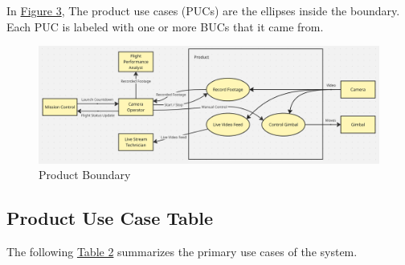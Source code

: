 \documentclass[12pt]{article}
\begin{document}
In \hyperref[img:product-boundary]{Figure 3}, The product use cases (PUCs) are
the ellipses inside the boundary. Each PUC is labeled with one or more BUCs
that it came from.

\FloatBarrier
\begin{figure}[h]
  \centering
  \includegraphics[width=\textwidth,height=\textheight,keepaspectratio]{../Images/product_boundary.png}
  \caption{Product Boundary}
  \label{img:product-boundary}
\end{figure}
\FloatBarrier

\subsection{Product Use Case Table}

The following \hyperref[tab:product-use-case-table]{Table 2} summarizes the
primary use cases of the system.
\end{document}
